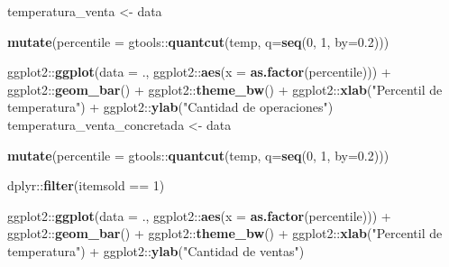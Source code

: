 \documentclass[
  12pt]{article}
\newenvironment{Shaded}{}{}
\newcommand{\DataTypeTok}[1]{\textcolor[rgb]{0.56,0.13,0.00}{#1}}
\newcommand{\DecValTok}[1]{\textcolor[rgb]{0.25,0.63,0.44}{#1}}
\newcommand{\FloatTok}[1]{\textcolor[rgb]{0.25,0.63,0.44}{#1}}
\newcommand{\KeywordTok}[1]{\textcolor[rgb]{0.00,0.44,0.13}{\textbf{#1}}}
\newcommand{\NormalTok}[1]{#1}
\newcommand{\OperatorTok}[1]{\textcolor[rgb]{0.40,0.40,0.40}{#1}}
\newcommand{\StringTok}[1]{\textcolor[rgb]{0.25,0.44,0.63}{#1}}
\begin{document}
\begin{Shaded}
\begin{Highlighting}[]
{{{{{\NormalTok{temperatura_venta <-}\StringTok{ }\NormalTok{data }\OperatorTok{%>%}
\StringTok{  }\KeywordTok{mutate}\NormalTok{(}\DataTypeTok{percentile =}\NormalTok{ gtools}\OperatorTok{::}\KeywordTok{quantcut}\NormalTok{(temp, }\DataTypeTok{q=}\KeywordTok{seq}\NormalTok{(}\DecValTok{0}\NormalTok{, }\DecValTok{1}\NormalTok{, }\DataTypeTok{by=}\FloatTok{0.2}\NormalTok{)))  }\OperatorTok{%>%}
\StringTok{  }\NormalTok{ggplot2}\OperatorTok{::}\KeywordTok{ggplot}\NormalTok{(}\DataTypeTok{data =}\NormalTok{ ., ggplot2}\OperatorTok{::}\KeywordTok{aes}\NormalTok{(}\DataTypeTok{x =} \KeywordTok{as.factor}\NormalTok{(percentile))) }\OperatorTok{+}
\StringTok{  }\NormalTok{ggplot2}\OperatorTok{::}\KeywordTok{geom_bar}\NormalTok{() }\OperatorTok{+}
\StringTok{  }\NormalTok{ggplot2}\OperatorTok{::}\KeywordTok{theme_bw}\NormalTok{() }\OperatorTok{+}
\StringTok{  }\NormalTok{ggplot2}\OperatorTok{::}\KeywordTok{xlab}\NormalTok{(}\StringTok{"Percentil de temperatura"}\NormalTok{) }\OperatorTok{+}\StringTok{ }\NormalTok{ggplot2}\OperatorTok{::}\KeywordTok{ylab}\NormalTok{(}\StringTok{"Cantidad de operaciones"}\NormalTok{)}
\NormalTok{temperatura_venta_concretada <-}\StringTok{ }\NormalTok{data }\OperatorTok{%>%}
\StringTok{  }\KeywordTok{mutate}\NormalTok{(}\DataTypeTok{percentile =}\NormalTok{ gtools}\OperatorTok{::}\KeywordTok{quantcut}\NormalTok{(temp, }\DataTypeTok{q=}\KeywordTok{seq}\NormalTok{(}\DecValTok{0}\NormalTok{, }\DecValTok{1}\NormalTok{, }\DataTypeTok{by=}\FloatTok{0.2}\NormalTok{)))  }\OperatorTok{%>%}
\StringTok{  }\NormalTok{dplyr}\OperatorTok{::}\KeywordTok{filter}\NormalTok{(itemsold }\OperatorTok{==}\StringTok{ }\DecValTok{1}\NormalTok{) }\OperatorTok{%>%}
\StringTok{  }\NormalTok{ggplot2}\OperatorTok{::}\KeywordTok{ggplot}\NormalTok{(}\DataTypeTok{data =}\NormalTok{ ., }
\NormalTok{                  ggplot2}\OperatorTok{::}\KeywordTok{aes}\NormalTok{(}\DataTypeTok{x =} \KeywordTok{as.factor}\NormalTok{(percentile))) }\OperatorTok{+}
\StringTok{  }\NormalTok{ggplot2}\OperatorTok{::}\KeywordTok{geom_bar}\NormalTok{() }\OperatorTok{+}
\StringTok{  }\NormalTok{ggplot2}\OperatorTok{::}\KeywordTok{theme_bw}\NormalTok{() }\OperatorTok{+}
\StringTok{  }\NormalTok{ggplot2}\OperatorTok{::}\KeywordTok{xlab}\NormalTok{(}\StringTok{"Percentil de temperatura"}\NormalTok{) }\OperatorTok{+}\StringTok{ }\NormalTok{ggplot2}\OperatorTok{::}\KeywordTok{ylab}\NormalTok{(}\StringTok{"Cantidad de ventas"}\NormalTok{)}

}}}}}}}}}}
\end{Highlighting}
\end{Shaded}
\end{document}
